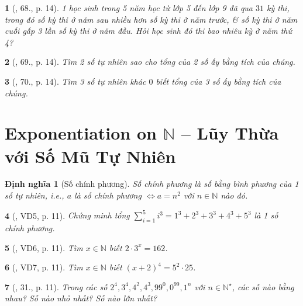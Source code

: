\documentclass{article}
\newtheorem{baitoan}{}
\newtheorem{dinhnghia}{Định nghĩa}
\begin{document}
\begin{baitoan}[\cite{Binh_Toan_6_tap_1}, 68., p. 14]
	1 học sinh trong 5 năm học từ lớp 5 đến lớp 9 đã qua $31$ kỳ thi, trong đó số kỳ thi ở năm sau nhiều hơn số kỳ thi ở năm trước, \& số kỳ thi ở năm cuối gấp 3 lần số kỳ thi ở năm đầu. Hỏi học sinh đó thi bao nhiêu kỳ ở năm thứ 4?
\end{baitoan}

\begin{baitoan}[\cite{Binh_Toan_6_tap_1}, 69., p. 14]
	Tìm 2 số tự nhiên sao cho tổng của 2 số ấy bằng tích của chúng.
\end{baitoan}

\begin{baitoan}[\cite{Binh_Toan_6_tap_1}, 70., p. 14]
	Tìm 3 số tự nhiên khác $0$ biết tổng của 3 số ấy bằng tích của chúng.
\end{baitoan}


\section{Exponentiation on $\mathbb{N}$ -- Lũy Thừa với Số Mũ Tự Nhiên}

\begin{dinhnghia}[Số chính phương]
	{\rm Số chính phương} là số bằng bình phương của 1 số tự nhiên, i.e., $a$ là số chính phương $\Leftrightarrow a = n^2$ với $n\in\mathbb{N}$ nào đó.
\end{dinhnghia}

\begin{baitoan}[\cite{Tuyen_Toan_6}, VD5, p. 11]
	Chứng minh tổng $\sum_{i=1}^5 i^3 = 1^3 + 2^3 + 3^3 + 4^3 + 5^3$ là 1 số chính phương.
\end{baitoan}

\begin{baitoan}[\cite{Tuyen_Toan_6}, VD6, p. 11]
	Tìm $x\in\mathbb{N}$ biết $2\cdot3^x = 162$.
\end{baitoan}

\begin{baitoan}[\cite{Tuyen_Toan_6}, VD7, p. 11]
	Tìm $x\in\mathbb{N}$ biết $(x + 2)^4 = 5^2\cdot25$.
\end{baitoan}

\begin{baitoan}[\cite{Tuyen_Toan_6}, 31., p. 11]
	Trong các số $2^4,3^4,4^2,4^3,99^0,0^{99},1^n$ với $n\in\mathbb{N}^\star$, các số nào bằng nhau? Số nào nhỏ nhất? Số nào lớn nhất?
\end{baitoan}
\end{document}

